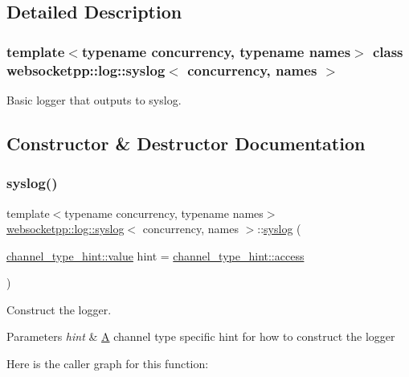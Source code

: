 \subsection{Detailed Description}
\subsubsection*{template$<$typename concurrency, typename names$>$\newline
class websocketpp\+::log\+::syslog$<$ concurrency, names $>$}

Basic logger that outputs to syslog. 

\subsection{Constructor \& Destructor Documentation}
\mbox{\label{classwebsocketpp_1_1log_1_1syslog_ab43c642587ea5628c25407341b0e5b11}} 
\subsubsection{\texorpdfstring{syslog()}{syslog()}\hspace{0.1cm}{\footnotesize\ttfamily [1/2]}}
{\footnotesize\ttfamily template$<$typename concurrency, typename names$>$ \\
\mbox{\hyperlink{classwebsocketpp_1_1log_1_1syslog}{websocketpp\+::log\+::syslog}}$<$ concurrency, names $>$\+::\mbox{\hyperlink{classwebsocketpp_1_1log_1_1syslog}{syslog}} (\begin{DoxyParamCaption}\item[{\mbox{\hyperlink{structwebsocketpp_1_1log_1_1channel__type__hint_ad12a7f6555b71aabdc4cbec604dc89dd}{channel\+\_\+type\+\_\+hint\+::value}}}]{hint = {\ttfamily \mbox{\hyperlink{structwebsocketpp_1_1log_1_1channel__type__hint_a8c38587fffbffbfcfc35577734b0d653}{channel\+\_\+type\+\_\+hint\+::access}}} }\end{DoxyParamCaption})\hspace{0.3cm}{\ttfamily [inline]}}



Construct the logger. 


\begin{DoxyParams}{Parameters}
{\em hint} & \mbox{\hyperlink{struct_a}{A}} channel type specific hint for how to construct the logger \\
\hline
\end{DoxyParams}
Here is the caller graph for this function\+:
\mbox{\label{classwebsocketpp_1_1log_1_1syslog_a28c4016aa44ca9d6415c36c2bc85bf30}} 
